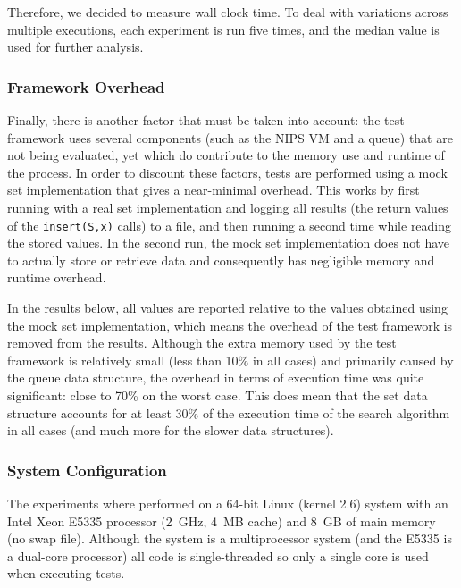 \documentclass{acm_proc_article-sp}
\begin{document}
Therefore, we decided to measure wall clock time. To deal with variations
across multiple executions, each experiment is run five times, and the median
value is used for further analysis.

\subsubsection{Framework Overhead}
Finally, there is another factor that must be taken into account: the test
framework uses several components (such as the NIPS VM and a queue) that are
not being evaluated, yet which do contribute to the memory use and runtime
of the process. In order to discount these factors, tests are performed using
a mock set implementation that gives a near-minimal overhead. This works
by first running with a real set implementation and logging all results
(the return values of the \verb#insert(S,x)# calls) to a file, and then
running a second time while reading the stored values. In the second run,
the mock set implementation does not have to actually store or retrieve
data and consequently has negligible memory and runtime overhead.

In the results below, all values are reported relative to the values obtained
using the mock set implementation, which means the overhead of the test
framework is removed from the results. Although the extra memory used by
the test framework is relatively small (less than 10\% in all cases) and
primarily caused by the queue data structure, the overhead in terms of
execution time was quite significant: close to 70\% on the worst case.
This does mean that the set data structure accounts for at least 30\%
of the execution time of the search algorithm in all cases (and much
more for the slower data structures).

\subsubsection{System Configuration}
The experiments where performed on a 64-bit Linux (kernel 2.6) system
with an Intel Xeon E5335 processor (2~GHz, 4~MB cache) and 8~GB of main
memory (no swap file). Although the system is a multiprocessor system
(and the E5335 is a dual-core processor) all code is single-threaded so
only a single core is used when executing tests.
\end{document}
